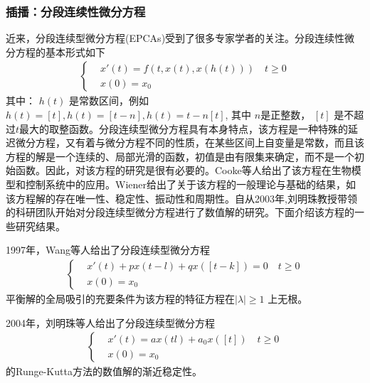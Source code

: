         \subsubsection{插播：分段连续性微分方程}
            \par
            近来，分段连续型微分方程(EPCAs)受到了很多专家学者的关注。分段连续性微分方程的基本形式如下
            \begin{align}\label{分段连续型微分方程的一般形式}
                \left\{
                    \begin{aligned}
                    &x'(t) = f(t,x(t),x(h(t))) \quad t \geqslant 0\\
                    &x(0) = x_0
                    \end{aligned}
                \right.
            \end{align}
            其中： $h(t)$ 是常数区间，例如$ h(t) = [t],h(t) = [t − n],h(t) = t − n[t]$, 其中 $n $是正整数， $[t]$ 是不超过$ t $最大的取整函数。分段连续型微分方程具有本身特点，该方程是一种特殊的延迟微分方程，又有着与微分方程不同的性质，在某些区间上自变量是常数，而且该方程的解是一个连续的、局部光滑的函数，初值是由有限集来确定，而不是一个初始函数。因此，对该方程的研究是很有必要的。Cooke等人\cite{1984.Cooke}给出了该方程在生物模型和控制系统中的应用。Wiener\cite{1993.Wiener}给出了关于该方程的一般理论与基础的结果，如该方程解的存在唯一性、稳定性、振动性和周期性。自从2003年,刘明珠教授带领的科研团队开始对分段连续型微分方程进行了数值解的研究。下面介绍该方程的一些研究结果。
            \par
            1997年，Wang等人\cite{1997.Wang}给出了分段连续型微分方程
            \begin{align*}
                \left\{
                    \begin{aligned}
                    &x'(t)+px(t-l)+qx([t-k]) = 0 \quad t \geqslant 0\\
                    &x(0) = x_0
                    \end{aligned}
                \right.
            \end{align*}
            平衡解的全局吸引的充要条件为该方程的特征方程在$ |\lambda| \geqslant 1$ 上无根。
            \par
            2004年，刘明珠等人\cite{2004.Liu}给出了分段连续型微分方程
            \begin{align}\label{1.35}
                \left\{
                    \begin{aligned}
                    &x'(t)= ax(tl)+a_0x([t])  \quad t \geqslant 0\\
                    &x(0) = x_0
                    \end{aligned}
                \right.
            \end{align}
            的Runge-Kutta方法的数值解的渐近稳定性。

